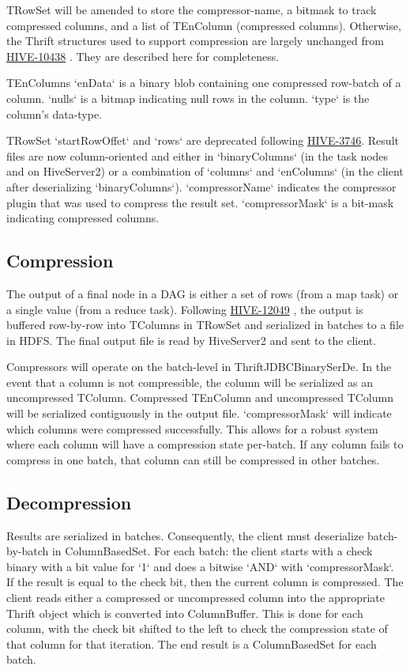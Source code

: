 \documentclass[11pt,a4paper]{article}
\begin{document}
		TRowSet will be amended to store the compressor-name, a bitmask to track compressed columns, and a list of TEnColumn (compressed columns).
		Otherwise, the Thrift structures used to support compression are largely unchanged from 
		\href{https://issues.apache.org/jira/browse/HIVE-10438}{HIVE-10438}
		. They are described here for completeness.
		
		TEnColumns `enData` is a binary blob containing one compressed row-batch of a column.
		`nulls` is a bitmap indicating null rows in the column.
		`type` is the column's data-type.
		
		TRowSet `startRowOffet` and `rows` are deprecated following \href{https://issues.apache.org/jira/browse/HIVE-3746}{HIVE-3746}.
		Result files are now column-oriented and either in `binaryColumns` (in the task nodes and on HiveServer2) or a combination of `columns` and `enColumns` (in the client after deserializing `binaryColumns`).
		`compressorName` indicates the compressor plugin that was used to compress the result set.
		`compressorMask` is a bit-mask indicating compressed columns.
		
		\subsection{Compression}
		The output of a final node in a DAG is either a set of rows (from a map task) or a single value (from a reduce task).
		Following
		\href{https://issues.apache.org/jira/browse/HIVE-12049}{HIVE-12049}
		, the output is buffered row-by-row into TColumns in TRowSet and serialized in batches to a file in HDFS.
		The final output file is read by HiveServer2 and sent to the client.
		
		Compressors will operate on the batch-level in ThriftJDBCBinarySerDe.
		In the event that a column is not compressible, the column will be serialized as an uncompressed TColumn.
		Compressed TEnColumn and uncompressed TColumn will be serialized contiguously in the output file. `compressorMask` will indicate which columns were compressed successfully.
		This allows for a robust system where each column will have a compression state per-batch. If any column fails to compress in one batch, that column can still be compressed in other batches.
		
		\subsection{Decompression}
		Results are serialized in batches.
		Consequently, the client must deserialize batch-by-batch in ColumnBasedSet.
		For each batch: the client starts with a check binary with a bit value for `1` and does a bitwise `AND` with `compressorMask`.
		If the result is equal to the check bit, then the current column is compressed.
		The client reads either a compressed or uncompressed column into the appropriate Thrift object which is converted into ColumnBuffer.
		This is done for each column, with the check bit shifted to the left to check the compression state of that column for that iteration.
		The end result is a ColumnBasedSet for each batch.
		
\end{document}
